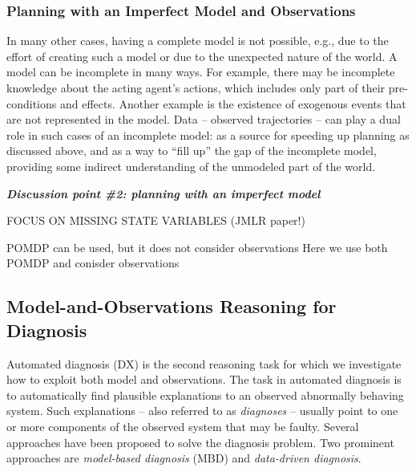 \documentclass[12pt]{article}
\newcommand{\note}[1]{\textbf{\textit{#1}}}
\begin{document}
\subsubsection{Planning with an Imperfect Model and Observations}

In many other cases, having a complete model is not possible, e.g., due to the effort of creating such a model or due to the unexpected nature of the world. 
A model can be incomplete in many ways. For example, there may be incomplete knowledge about the acting agent's actions, which includes only part of their pre-conditions and effects. Another example is the existence of exogenous events that are not represented in the model. Data -- observed trajectories -- can play a dual role in such cases of an incomplete model: as a source for speeding up planning as discussed above, and as a way to ``fill up'' the gap of the incomplete model, providing some indirect understanding of the unmodeled part of the world. 


\note{Discussion point \#2: planning with an imperfect model}

FOCUS ON MISSING STATE VARIABLES (JMLR paper!)



POMDP can be used, but it does not consider observations
Here we use both POMDP and conisder observations




\subsection{Model-and-Observations Reasoning for Diagnosis}
Automated diagnosis (DX) is the second reasoning task for which we investigate how to exploit both model and observations. The task in automated diagnosis is to automatically find plausible explanations to an observed abnormally behaving system. Such explanations -- also referred to as {\em diagnoses} -- usually point to one or more components of the observed system that may be faulty. Several approaches have been proposed to solve the diagnosis problem. Two prominent approaches are {\em model-based diagnosis} (MBD) and {\em data-driven diagnosis}. 
\end{document}

